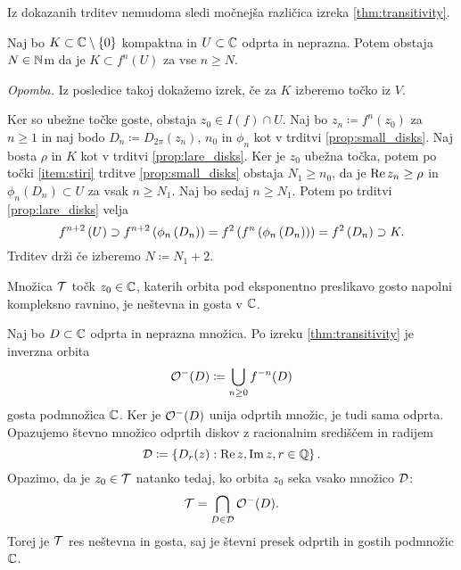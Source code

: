 \noindent Iz dokazanih trditev nemudoma sledi močnejša različica izreka \ref{thm:transitivity}.

\begin{posledica}
    Naj bo \(K \subset \mathbb C \setminus \left\{ 0 \right\}\) kompaktna in \(U \subset \mathbb C\) odprta in neprazna. Potem obstaja \(N \in \mathbb N\)m da je \(K \subset f^n (U)\) za vse \(n \geq N\).
\end{posledica}

\noindent \textit{Opomba.} Iz posledice takoj dokažemo izrek, če za \(K\) izberemo točko iz \(V\).

\begin{dokaz}
    Ker so ubežne točke goste, obstaja \(z_0 \in I (f) \cap U\). Naj bo \(z_n \coloneq f^n (z_0)\) za \(n \geq 1\) in naj bodo \(D_n \coloneq D_{2 \pi} (z_n)\), \(n_0\) in \(\phi_n\) kot v trditvi \ref{prop:small_disks}. Naj bosta \(\rho\) in \(K\) kot v trditvi \ref{prop:lare_disks}. Ker je \(z_0\) ubežna točka, potem po točki \ref{item:stiri} trditve \ref{prop:small_disks} obstaja \(N_1 \geq n_0\), da je \(\operatorname{Re} z_n \geq \rho\) in \(\phi_n (D_n) \subset U\) za vsak \(n \geq N_1\). Naj bo sedaj \(n \geq N_1\). Potem po trditvi \ref{prop:lare_disks} velja
    \[f^{n + 2} \left( U \right) \supset f^{n + 2} \left( \phi_n \left( D_n \right) \right) = f^2 \left( f^n \left( \phi_n \left( D_n \right) \right) \right) = f^2 \left( D_n \right) \supset K.\]
    Trditev drži če izberemo \(N \coloneq N_1 + 2\).
\end{dokaz}

\begin{posledica}
    Množica \(\mathcal T\) točk \(z_0 \in \mathbb C\), katerih orbita pod eksponentno preslikavo gosto napolni kompleksno ravnino, je neštevna in gosta v \(\mathbb C\).
\end{posledica}

\begin{dokaz}
    Naj bo \(D \subset \mathbb C\) odprta in neprazna množica. Po izreku \ref{thm:transitivity} je inverzna orbita
    \[\mathcal O^- (D) \coloneq \bigcup_{n \geq 0} f^{- n} (D)\]
    gosta podmnožica \(\mathbb C\). Ker je \(\mathcal O^- (D)\) unija odprtih množic, je tudi sama odprta. Opazujemo števno množico odprtih diskov z racionalnim središčem in radijem
    \[\mathcal D \coloneq \left\{ D_r (z) : \operatorname{Re} z, \operatorname{Im} z, r \in \mathbb Q \right\}.\]
    Opazimo, da je \(z_0 \in \mathcal T\) natanko tedaj, ko orbita \(z_0\) seka vsako množico \(\mathcal D\):
    \[\mathcal T = \bigcap_{D \in \mathcal D} \mathcal O^- (D).\]
    Torej je \(\mathcal T\) res neštevna in gosta, saj je števni presek odprtih in gostih podmnožic \(\mathbb C\).
\end{dokaz}